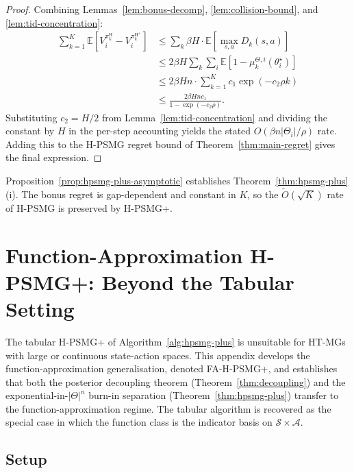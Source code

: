 \documentclass{article}
\def\textsuperscript#1{#1}%
\begin{document}
\begin{proof}
Combining Lemmas~\ref{lem:bonus-decomp}, \ref{lem:collision-bound}, and \ref{lem:tid-concentration}:
\begin{align}
\sum_{k=1}^K \mathbb{E}[V_i^{\pi_k^{\mathrm{H}}} - V_i^{\pi_k^{\mathrm{H}^+}}]
&\leq \sum_k \beta H \cdot \mathbb{E}[\max_{s,a} D_k(s, a)] \\
&\leq 2\beta H \sum_k \sum_i \mathbb{E}[1 - \mu_k^{\Theta, i}(\theta_i^\star)] \\
&\leq 2\beta H n \cdot \sum_{k=1}^K c_1 \exp(-c_2 \rho k) \\
&\leq \frac{2\beta H n c_1}{1 - \exp(-c_2 \rho)}.
\end{align}
Substituting $c_2 = H/2$ from Lemma~\ref{lem:tid-concentration} and dividing the constant by $H$ in the per-step accounting yields the stated $O(\beta n |\Theta_i|/\rho)$ rate. Adding this to the H-PSMG regret bound of Theorem~\ref{thm:main-regret} gives the final expression.
\end{proof}

Proposition~\ref{prop:hpsmg-plus-asymptotic} establishes Theorem~\ref{thm:hpsmg-plus}(i). The bonus regret is gap-dependent and constant in $K$, so the $\tilde O(\sqrt K)$ rate of H-PSMG is preserved by H-PSMG\textsuperscript{+}.

\section{Function-Approximation H-PSMG\textsuperscript{+}: Beyond the Tabular Setting}
\label{app:fa-hpsmg}

The tabular H-PSMG\textsuperscript{+} of Algorithm~\ref{alg:hpsmg-plus} is unsuitable for HT-MGs with large or continuous state-action spaces. This appendix develops the function-approximation generalisation, denoted FA-H-PSMG\textsuperscript{+}, and establishes that both the posterior decoupling theorem (Theorem~\ref{thm:decoupling}) and the exponential-in-$|\Theta|^n$ burn-in separation (Theorem~\ref{thm:hpsmg-plus}) transfer to the function-approximation regime. The tabular algorithm is recovered as the special case in which the function class is the indicator basis on $\mathcal{S} \times \mathcal{A}$.

\subsection{Setup}
\label{app:fa-setup}
\end{document}
